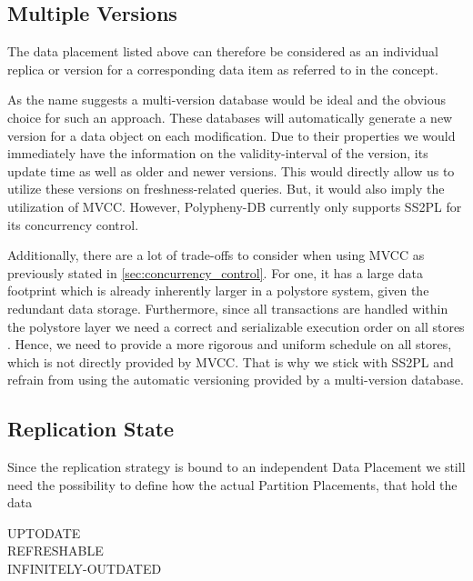 \subsection{Multiple Versions}

The data placement listed above can therefore be considered as an individual replica or version for a corresponding data item as referred to in the concept.

As the name suggests a multi-version database would be ideal and the obvious choice for such an approach.
These databases will automatically generate a new version for a data object on each modification.
Due to their properties we would immediately have the information on the validity-interval of the version, its update time as well as older and newer versions.
This would directly allow us to utilize these versions on freshness-related queries. But, it would also imply the utilization of MVCC.
However, Polypheny-DB currently only supports SS2PL for its concurrency control. 

Additionally, there are a lot of trade-offs to consider when using MVCC as previously stated in \ref{sec:concurrency_control}.
For one, it has a large data footprint which is already inherently larger in a polystore system, given the redundant data storage.
Furthermore, since all transactions are handled within the polystore layer we need a correct and serializable execution order on all stores . 
Hence, we need to provide a more rigorous and uniform schedule on all stores, which is not directly provided by MVCC.
That is why we stick with SS2PL and refrain from using the automatic versioning provided by a multi-version database.\\



\subsection{Replication State}

Since the replication strategy is bound to an independent Data Placement we still need the possibility to define how the actual Partition Placements, that hold the data 


\begin{description}
    \item [UPTODATE]
    \item [REFRESHABLE]
    \item [INFINITELY-OUTDATED]
\end{description}

